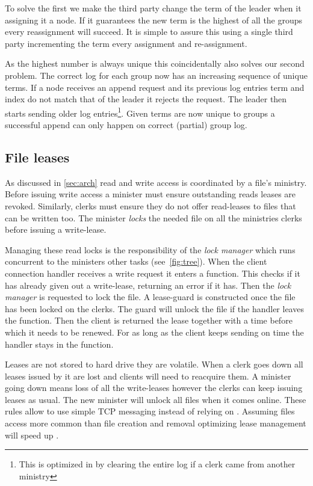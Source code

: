 To solve the first we make the third party change the term of the leader when it assigning it a node. If it guarantees the new term is the highest of all the groups every reassignment will succeed. It is simple to assure this using a single third party incrementing the term every assignment and re-assignment. 

As the highest number is always unique this coincidentally also solves our second problem. The correct log for each group now has an increasing sequence of unique terms. If a node receives an append request and its previous log entries term and index do not match that of the leader it rejects the request. The leader then starts sending older log entries\footnote{This is optimized in \name{} by clearing the entire log if a clerk came from another ministry}. Given terms are now unique to groups a successful append can only happen on correct (partial) group log.

\subsection{File leases}
As discussed in \cref{sec:arch} read and write access is coordinated by a file's ministry. Before issuing write access a minister must ensure outstanding reads leases are revoked. Similarly, clerks must ensure they do not offer read-leases to files that can be written too. The minister \emph{locks} the needed file on all the ministries clerks before issuing a write-lease. 

Managing these read locks is the responsibility of the \textit{lock manager} which runs concurrent to the ministers other tasks (see~\cref{fig:tree}). When the client connection handler \straightTasksLeg{} receives a write request it enters a  function. This checks if it has already given out a write-lease, returning an error if it has. Then the \textit{lock manager} is requested to lock the file. A lease-guard is constructed once the file has been locked on the clerks. The guard will unlock the file if the handler leaves the  function. Then the client is returned the lease together with a time before which it needs to be renewed. For as long as the client keeps sending  on time the handler stays in the  function.

Leases are not stored to hard drive they are volatile. When a clerk goes down all leases issued by it are lost and clients will need to reacquire them. A minister going down means loss of all the write-leases however the clerks can keep issuing leases as usual. The new minister will unlock all files when it comes online. These rules allow \name{} to use simple TCP messaging instead of relying on \raft{}. Assuming files access more common than file creation and removal optimizing lease management will speed up \name{}.
%

